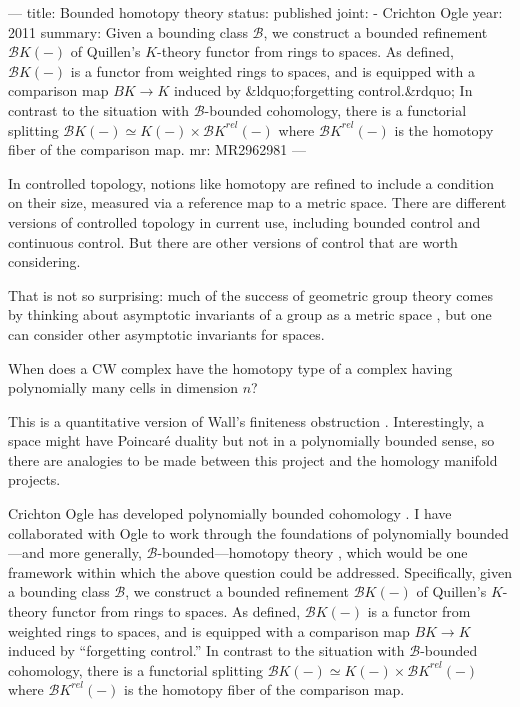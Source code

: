---
title: Bounded homotopy theory
status: published
joint:
  - Crichton Ogle
year: 2011
summary: Given a bounding class ${\mathcal B}$, we construct a bounded refinement ${\mathcal{B}K}(-)$ of Quillen's $K$-theory functor from rings to spaces. As defined, ${\mathcal{B}K}(-)$ is a functor from weighted rings to spaces, and is equipped with a comparison map $BK \to K$ induced by &ldquo;forgetting control.&rdquo; In contrast to the situation with $\mathcal{B}$-bounded cohomology, there is a functorial splitting ${\mathcal{B}K}(-) \simeq K(-) \times {\mathcal{B}K}^{rel}(-)$ where ${\mathcal{B}K}^{rel}(-)$ is the homotopy fiber of the comparison map.
mr: MR2962981
---

In controlled topology, notions like homotopy are refined to include a condition on their size, measured via a reference map to a metric space.  There are different versions of controlled topology in current use, including bounded control and continuous control. But there are other versions of control that are worth considering.

That is not so surprising: much of the success of geometric group theory comes by thinking about asymptotic invariants of a group as a metric space \cite{MR1253544}, but one can consider other asymptotic invariants for spaces.
\begin{question}
When does a CW complex have the homotopy type of a complex having polynomially many cells in dimension $n$?
\end{question}
This is a quantitative version of Wall's finiteness obstruction \cite{MR171284}.  Interestingly, a space might have Poincar\'e duality but not in a polynomially bounded sense, so there are analogies to be made between this project and the homology manifold projects.

Crichton Ogle has developed polynomially bounded cohomology \cite{MR2109110}.  I have collaborated with Ogle to work through the foundations of polynomially bounded---and more generally, $\mathcal{B}$-bounded---homotopy theory \cite{MR2962981}, which would be one framework within which the above question could be addressed. Specifically, given a bounding class $\mathcal{B}$, we construct a bounded refinement ${\mathcal{B} K}(-)$ of Quillen's $K$-theory functor from rings to spaces. As defined, ${\mathcal{B} K}(-)$ is a functor from weighted rings to spaces, and is equipped with a comparison map $BK \to K$ induced by ``forgetting control.''  In contrast to the situation with $\mathcal{B}$-bounded cohomology, there is a functorial splitting ${\mathcal{B} K}(-) \simeq K(-) \times {\mathcal{B} K}^{rel}(-)$ where ${\mathcal{B} K}^{rel}(-)$ is the homotopy fiber of the comparison map.

